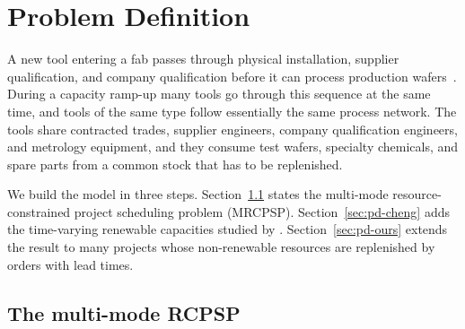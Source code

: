 \providecommand{\calP}{\mathcal{P}}
\providecommand{\calJ}{\mathcal{J}}
\providecommand{\calQ}{\mathcal{Q}}
\providecommand{\calR}{\mathcal{R}}
\providecommand{\calM}{\mathcal{M}}
\providecommand{\calN}{\mathcal{N}}
\providecommand{\calT}{\mathcal{T}}

\section{Problem Definition}\label{sec:problem}

A new tool entering a fab passes through physical installation, supplier
qualification, and company qualification before it can process production
wafers~\citep{ieee2013semircpsp}. During a capacity ramp-up many tools go
through this sequence at the same time, and tools of the same type follow
essentially the same process network. The tools share contracted trades,
supplier engineers, company qualification engineers, and metrology equipment,
and they consume test wafers, specialty chemicals, and spare parts from a
common stock that has to be replenished.

We build the model in three steps. Section~\ref{sec:pd-mrcpsp} states the
multi-mode resource-constrained project scheduling problem (MRCPSP).
Section~\ref{sec:pd-cheng} adds the time-varying renewable capacities studied
by \citet{cheng2015splitting}. Section~\ref{sec:pd-ours} extends the result to
many projects whose non-renewable resources are replenished by orders with
lead times.

\subsection{The multi-mode RCPSP}\label{sec:pd-mrcpsp}

